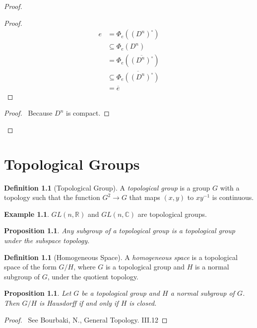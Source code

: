 \documentclass{book}
\let\qed\relax
\newtheorem{prop}[ax]{Proposition}
\theoremstyle{definition}
\newtheorem{df}[ax]{Definition}
\newtheorem{ex}[ax]{Example}
\newcommand{\inv}[1]{\ensuremath{{#1}^{-1}}}
\begin{document}
\begin{proof}
\pf
{}
\begin{proof}
	\pf
	\begin{align*}
	e & = \Phi_e((D^n)^\circ) \\
	& \subseteq \Phi_e(D^n) \\
	& = \Phi_e(\overline{(D^n)^\circ}) \\
	& \subseteq \overline{\Phi_e((D^n)^\circ)} \\
	& = \overline{e}
	\end{align*}
\end{proof}
\begin{proof}
	\pf\ Because $D^n$ is compact.
\end{proof}
\qed
\end{proof}

\chapter{Topological Groups}

\begin{df}[Topological Group]
A \emph{topological group} is a group $G$ with a topology such that the function $G^2 \rightarrow G$ that maps $(x,y)$ to $x\inv{y}$ is continuous.
\end{df}

\begin{ex}
$GL(n,\mathbb{R})$ and $GL(n,\mathbb{C})$ are topological groups.
\end{ex}

\begin{prop}
Any subgroup of a topological group is a topological group under the subspace topology.
\end{prop}

\begin{df}[Homogeneous Space]
A \emph{homogeneous space} is a topological space of the form $G/H$, where $G$ is a topological group and $H$ is a normal subgroup of $G$, under the quotient topology.
\end{df}

\begin{prop}
Let $G$ be a topological group and $H$ a normal subgroup of $G$. Then $G/H$ is Hausdorff if and only if $H$ is closed.
\end{prop}

\begin{proof}
\pf\ See Bourbaki, N., General Topology. III.12 \qed
\end{proof}
\end{document}
